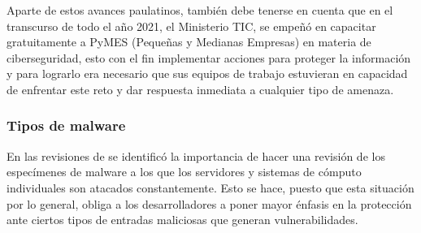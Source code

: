 \begin{displayquote}
  Aparte de estos avances paulatinos, también debe tenerse en cuenta que en el
  transcurso de todo el año 2021, el Ministerio TIC, se empeñó en capacitar
  gratuitamente a PyMES (Pequeñas y Medianas Empresas) en materia de
  ciberseguridad, esto con el fin implementar acciones para proteger la
  información y para lograrlo era necesario que sus equipos de trabajo
  estuvieran en capacidad de enfrentar este reto y dar respuesta inmediata a
  cualquier tipo de amenaza.
  \parencite[MinTic, 2021, como se cita en][]{Bueno2022}
\end{displayquote}

\subsubsection{Tipos de malware}

En las revisiones de \textcite{Mosquera2019} se identificó la importancia de
hacer una revisión de los especímenes de malware a los que los servidores y
sistemas de cómputo individuales son atacados constantemente. Esto se hace,
puesto que esta situación por lo general, obliga a los desarrolladores a poner
mayor énfasis en la protección ante ciertos tipos de entradas maliciosas que
generan vulnerabilidades.

